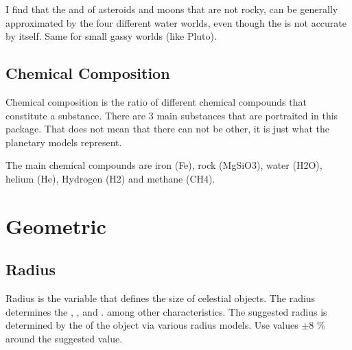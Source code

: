 \documentclass[letterpaper,10pt,english]{sphinxmanual}
\begin{document}
\sphinxAtStartPar
I find that the {\hyperref[\detokenize{quantities/material/density:id1}]{}} and {\hyperref[\detokenize{quantities/geometric/radius:id1}]{}}
of asteroids and moons that are not rocky,
can be generally approximated by the four different water worlds,
even though the {\hyperref[\detokenize{quantities/material/chemical_composition:id1}]{}}
is not accurate by itself.
Same for small gassy worlds (like Pluto).


\subsection{Chemical Composition}
\label{\detokenize{quantities/material/chemical_composition:chemical-composition}}\label{\detokenize{quantities/material/chemical_composition::doc}}\label{\detokenize{quantities/material/chemical_composition:id1}}
\sphinxAtStartPar
Chemical composition is the ratio of different chemical compounds that constitute a substance.
There are 3 main substances that are portraited in this package.
That does not mean that there can not be other, it is just what the planetary {\hyperref[\detokenize{quantities/geometric/radius:id1}]{}} models represent.

\sphinxAtStartPar
The main chemical compounds are iron (Fe), rock (MgSiO3), water (H2O),
helium (He), Hydrogen (H2) and methane (CH4).


\section{Geometric}
\label{\detokenize{quantities/geometric/geometric:geometric}}\label{\detokenize{quantities/geometric/geometric::doc}}

\subsection{Radius}
\label{\detokenize{quantities/geometric/radius:radius}}\label{\detokenize{quantities/geometric/radius::doc}}\label{\detokenize{quantities/geometric/radius:id1}}
\sphinxAtStartPar
Radius is the variable that defines the size of celestial objects.
The radius determines the {\hyperref[\detokenize{quantities/geometric/circumference:id1}]{}}, {\hyperref[\detokenize{quantities/geometric/surface_area:id1}]{}}, {\hyperref[\detokenize{quantities/geometric/volume:id1}]{}} and {\hyperref[\detokenize{quantities/material/density:id1}]{}}.
among other characteristics.
The suggested radius is determined by the {\hyperref[\detokenize{quantities/material/mass:id1}]{}} of the
object via various radius models. Use values \(\pm 8\) \% around
the suggested value.
\end{document}

